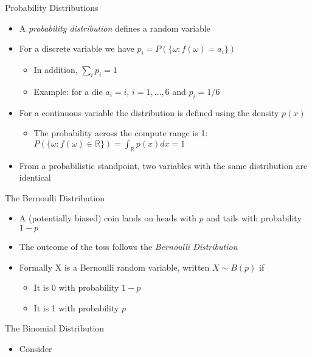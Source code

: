 \documentclass{beamer}
\begin{document}
\begin{frame}{Probability Distributions} 
\begin{itemize}
\item A \emph{probability distribution} defines a random variable 
\item For a discrete variable we have $p_i = P(\{\omega: f(\omega) = a_i\})$
\begin{itemize}
\item In addition, $\sum_i p_i  = 1$
\item Example: for a die $a_i = i$, $i=1,\ldots, 6$ and $p_i = 1/6$
\end{itemize}
\item For a continuous variable the distribution is defined using the density $p(x)$
\begin{itemize}
\item The probability across the compute range is 1: $P(\{\omega: f(\omega) \in \mathbb{R}\}) = \int_\mathbb{R} p(x) dx = 1$ 
\end{itemize}
\item From a probabilistic standpoint, two variables with the same distribution are identical 
\end{itemize}
\end{frame}

\begin{frame}{The Bernoulli Distribution}
\begin{itemize}
 \item A (potentially biased) coin lands on heads with $p$ and tails with probability $1-p$
\item The outcome of the toss follows the \emph{Bernoulli Distribution} 
\item Formally X is a Bernoulli random variable, written $X \sim B(p)$ if 
\begin{itemize}
\item It is 0 with probability $1-p$ 
\item It is 1 with probability $p$ 
\end{itemize} 
\end{itemize}
\end{frame}

\begin{frame}{The Binomial Distribution}  
\begin{itemize} 
 \item Consider 
\end{itemize}
 
\end{frame}
\end{document}
